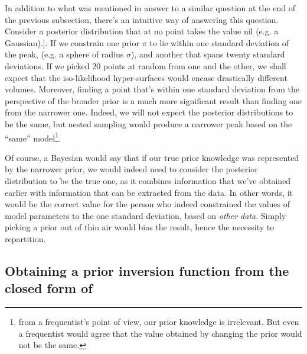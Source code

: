 \documentclass[usenatbib]{mnras}
\begin{document}
In addition to what was mentioned in answer to a similar question
at the end of the previous subsection, there's an intuitive way of
answering this question. Consider a posterior distribution that at
no point takes the value nil (e.g. a Gaussian).]. If we constrain one
prior \(\pi\) to lie within one standard deviation of the peak,
(e.g. a sphere of radius \(\sigma\)), and another that spans twenty
standard deviations. If we picked 20 points at random from one and
the other, we shall expect that the iso-likelihood hyper-surfaces
would encase drastically different volumes. Moreover, finding a
point that's within one standard deviation from the perspective of
the broader prior is a much more significant result than finding
one from the narrower one. Indeed, we will not expect the posterior
distributions to be the same, but nested sampling would produce a
narrower peak based on the ``same'' model\footnote{from a frequentist's point of view, our prior knowledge is
irrelevant. But even a frequentist would agree that the value obtained
by changing the prior would not be the same.}. 

Of course, a Bayesian would say that if our true prior knowledge
was represented by the narrower prior, we would indeed need to
consider the posterior distribution to be the true one, as it
combines information that we've obtained earlier with information
that can be extracted from the data. In other words, it would be
the correct value for the person who indeed constrained the values
of model parameters to the one standard deviation, based on \emph{other
data}. Simply picking a prior out of thin air would bias the
result, hence the necessity to repartition. 



\subsection{Obtaining a prior inversion function from the closed form of}
\label{sec:org333d817}
\end{document}
